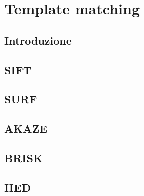 \chapter{Template matching}
\label{chap:template-matching}

\section{Introduzione}
\section{SIFT}
\section{SURF}
\section{AKAZE}
\section{BRISK}
\section{HED}

